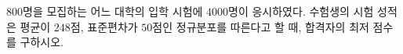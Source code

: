 $800$명을 모집하는 어느 대학의 입학 시험에 $4000$명이 응시하였다. 수험생의 시험 성적은 평균이 $248$점, 표준편차가 $50$점인 정규분포를 따른다고 할 때, 합격자의 최저 점수를 구하시오. 
